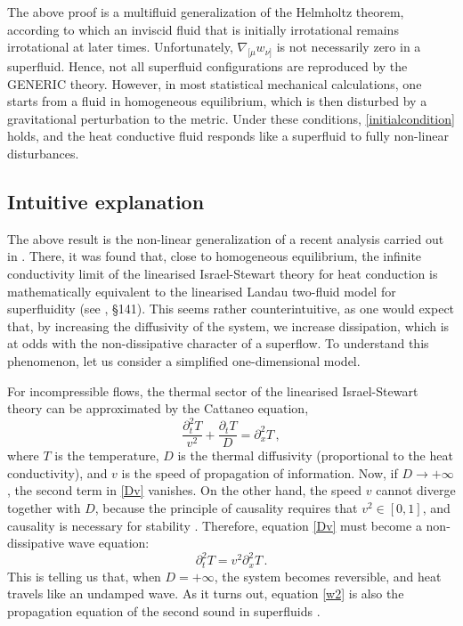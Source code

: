 \documentclass[a4paper, amsfonts, amssymb, amsmath, reprint, showkeys, nofootinbib, twoside, onecolumn, notitlepage]{revtex4-1}
\begin{document}
The above proof is a multifluid generalization of the Helmholtz theorem, according to which an inviscid fluid that is initially irrotational remains irrotational at later times.
Unfortunately, $\nabla_{[\mu}w_{\nu]}$ is not necessarily zero in a superfluid. Hence, not all superfluid configurations are reproduced by the GENERIC theory. However, in most statistical mechanical calculations, one starts from a fluid in homogeneous equilibrium, which is then disturbed by a gravitational perturbation to the metric. Under these conditions, \eqref{initialcondition} holds, and the heat conductive fluid responds like a superfluid to fully non-linear disturbances.

\subsection{Intuitive explanation}

The above result is the non-linear generalization of a recent analysis carried out in \cite{GavassinoUniversalityII2023}. There, it was found that, close to homogeneous equilibrium, the infinite conductivity limit of the linearised Israel-Stewart theory for heat conduction \cite{Israel_Stewart_1979} is mathematically equivalent to the linearised Landau two-fluid model for superfluidity  (see \cite{landau6}, \S 141). This seems rather counterintuitive, as one would expect that, by increasing the diffusivity of the system, we increase dissipation, which is at odds with the non-dissipative character of a superflow. To understand this phenomenon, let us consider a simplified one-dimensional model. 

For incompressible flows, the thermal sector of the linearised Israel-Stewart theory can be approximated by the Cattaneo equation,
\begin{equation}\label{Dv}
\dfrac{\partial^2_t T}{v^2} + \dfrac{\partial_t T}{D} = \partial^2_x T \, ,
\end{equation}
where $T$ is the temperature, $D$ is the thermal diffusivity (proportional to the heat conductivity), and $v$ is the speed of propagation of information. Now, if $D \rightarrow +\infty$, the second term in \eqref{Dv} vanishes. On the other hand, the speed $v$ cannot diverge together with $D$, because the principle of causality requires that $v^2 \in [0,1]$, and causality is necessary for stability \cite{GavassinoCausality2021,GavassinoSuperlum2021,
GavassinoBounds2023}. Therefore, equation \eqref{Dv} must become a non-dissipative wave equation:
\begin{equation}\label{w2}
\partial^2_t T = v^2 \partial^2_x T \, .
\end{equation}
This is telling us that, when $D=+\infty$, the system becomes reversible, and heat travels like an undamped wave. As it turns out, equation \eqref{w2} is also the propagation equation of the second sound in superfluids \cite{landau6}. 
\end{document}
